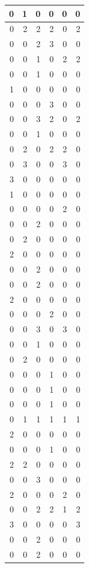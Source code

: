 \documentclass[
  12pt,
]{krantz}
\begin{document}
\begin{tabular}{r|r|r|r|r|r}
\hline
0 & 1 & 0 & 0 & 0 & 0\\
\hline
0 & 2 & 2 & 2 & 0 & 2\\
\hline
0 & 0 & 2 & 3 & 0 & 0\\
\hline
0 & 0 & 1 & 0 & 2 & 2\\
\hline
0 & 0 & 1 & 0 & 0 & 0\\
\hline
1 & 0 & 0 & 0 & 0 & 0\\
\hline
0 & 0 & 0 & 3 & 0 & 0\\
\hline
0 & 0 & 3 & 2 & 0 & 2\\
\hline
0 & 0 & 1 & 0 & 0 & 0\\
\hline
0 & 2 & 0 & 2 & 2 & 0\\
\hline
0 & 3 & 0 & 0 & 3 & 0\\
\hline
3 & 0 & 0 & 0 & 0 & 0\\
\hline
1 & 0 & 0 & 0 & 0 & 0\\
\hline
0 & 0 & 0 & 0 & 2 & 0\\
\hline
0 & 0 & 2 & 0 & 0 & 0\\
\hline
0 & 2 & 0 & 0 & 0 & 0\\
\hline
2 & 0 & 0 & 0 & 0 & 0\\
\hline
0 & 0 & 2 & 0 & 0 & 0\\
\hline
0 & 0 & 2 & 0 & 0 & 0\\
\hline
2 & 0 & 0 & 0 & 0 & 0\\
\hline
0 & 0 & 0 & 2 & 0 & 0\\
\hline
0 & 0 & 3 & 0 & 3 & 0\\
\hline
0 & 0 & 1 & 0 & 0 & 0\\
\hline
0 & 2 & 0 & 0 & 0 & 0\\
\hline
0 & 0 & 0 & 1 & 0 & 0\\
\hline
0 & 0 & 0 & 1 & 0 & 0\\
\hline
0 & 0 & 0 & 1 & 0 & 0\\
\hline
0 & 1 & 1 & 1 & 1 & 1\\
\hline
2 & 0 & 0 & 0 & 0 & 0\\
\hline
0 & 0 & 0 & 1 & 0 & 0\\
\hline
2 & 2 & 0 & 0 & 0 & 0\\
\hline
0 & 0 & 3 & 0 & 0 & 0\\
\hline
2 & 0 & 0 & 0 & 2 & 0\\
\hline
0 & 0 & 2 & 2 & 1 & 2\\
\hline
3 & 0 & 0 & 0 & 0 & 3\\
\hline
0 & 0 & 2 & 0 & 0 & 0\\
\hline
0 & 0 & 2 & 0 & 0 & 0\\

\end{tabular}
\end{document}
